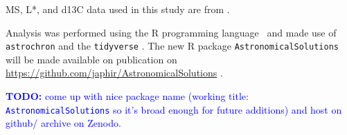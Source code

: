 \documentclass[draft]{agujournal2019}
\newcommand{\ijk}{\textcolor{blue}}
\begin{document}
\Gls{MS}, \gls{L*}, and \gls{d13C} data used in this study are from .

Analysis was performed using the R programming language~\cite{RCoreTeam2020} and made use of \texttt{astrochron}  and the \texttt{tidyverse} .
The new R package \texttt{AstronomicalSolutions} will be made available on publication on \url{https://github.com/japhir/AstronomicalSolutions} .

\ijk{\textbf{TODO:} come up with nice package name (working title: \texttt{AstronomicalSolutions} so it's broad enough for future additions) and host on github/ archive on Zenodo.}







\acknowledgments
\end{document}

